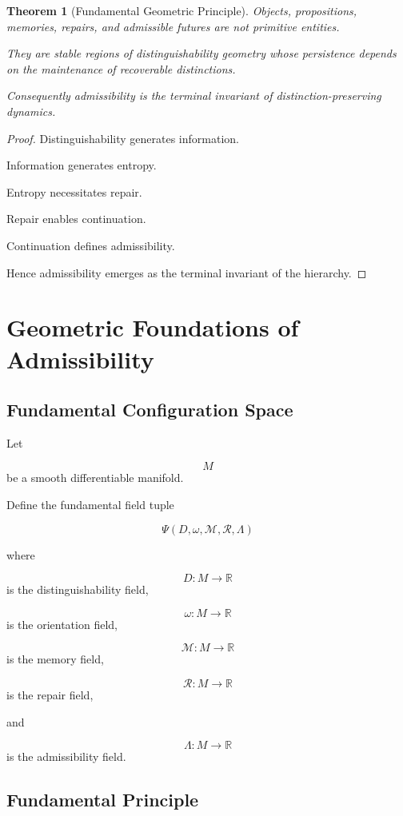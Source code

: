\documentclass[12pt]{article}
\newtheorem{theorem}{Theorem}[section]
\theoremstyle{remark}
\begin{document}
\begin{theorem}[Fundamental Geometric Principle]
Objects, propositions, memories, repairs, and admissible futures are not primitive entities.

They are stable regions of distinguishability geometry whose persistence depends on the maintenance of recoverable distinctions.

Consequently admissibility is the terminal invariant of distinction-preserving dynamics.
\end{theorem}

\begin{proof}
Distinguishability generates information.

Information generates entropy.

Entropy necessitates repair.

Repair enables continuation.

Continuation defines admissibility.

Hence admissibility emerges as the terminal invariant of the hierarchy.
\end{proof}

\section{Geometric Foundations of Admissibility}

\subsection{Fundamental Configuration Space}

Let

\[
M
\]
be a smooth differentiable manifold.

Define the fundamental field tuple

\[
\Psi
(D,\omega,\mathcal M,\mathcal R,\Lambda)
\]

where

\[
D:M\rightarrow\mathbb R
\]
is the distinguishability field,

\[
\omega:M\rightarrow\mathbb R
\]
is the orientation field,

\[
\mathcal M:M\rightarrow\mathbb R
\]
is the memory field,

\[
\mathcal R:M\rightarrow\mathbb R
\]
is the repair field,

and

\[
\Lambda:M\rightarrow\mathbb R
\]
is the admissibility field.

\subsection{Fundamental Principle}
\end{document}
